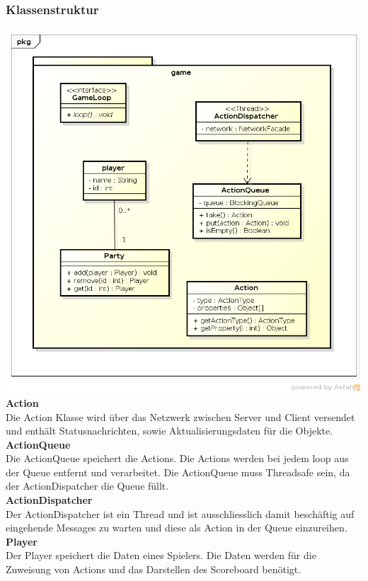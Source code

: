 \documentclass[11pt]{scrartcl}
\begin{document}
\subsubsection{Klassenstruktur}
\includegraphics[scale=0.75]{ClassDiagramGame}
\newpage
\textbf{Action}\\
Die Action Klasse wird über das Netzwerk zwischen Server und Client versendet und enthält Statusnachrichten, sowie Aktualisierungsdaten für die Objekte.\\

\textbf{ActionQueue}\\
Die ActionQueue speichert die Actions. Die Actions werden bei jedem loop aus der Queue entfernt und verarbeitet. Die ActionQueue muss Threadsafe sein, da der ActionDispatcher die Queue füllt.\\

\textbf{ActionDispatcher}\\
Der ActionDispatcher ist ein Thread und ist ausschliesslich damit beschäftig auf eingehende Messages zu warten und diese als Action in der Queue einzureihen.\\

\textbf{Player}\\
Der Player speichert die Daten eines Spielers. Die Daten werden für die Zuweisung von Actions und das Darstellen des Scoreboard benötigt.\\
\end{document}
